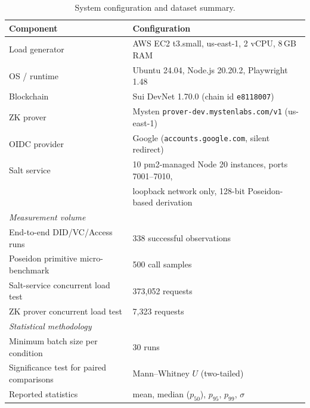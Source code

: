 \begin{table}[t]
  \centering
  \caption{System configuration and dataset summary.}
  \label{tab:system_config}
  \footnotesize
  \begin{tabular}{ll}
    \toprule
    \textbf{Component} & \textbf{Configuration} \\
    \midrule
    Load generator & AWS EC2 t3.small, us-east-1, 2 vCPU, 8\,GB RAM \\
    OS / runtime   & Ubuntu 24.04, Node.js 20.20.2, Playwright 1.48 \\
    Blockchain     & Sui DevNet 1.70.0 (chain id \texttt{e8118007}) \\
    ZK prover      & Mysten \texttt{prover-dev.mystenlabs.com/v1} (us-east-1) \\
    OIDC provider  & Google (\texttt{accounts.google.com}, silent redirect) \\
    Salt service   & 10 pm2-managed Node 20 instances, ports 7001--7010, \\
                   & loopback network only, 128-bit Poseidon-based derivation \\
    \midrule
    \multicolumn{2}{l}{\emph{Measurement volume}} \\
    End-to-end DID/VC/Access runs & 338 successful observations \\
    Poseidon primitive micro-benchmark & 500 call samples \\
    Salt-service concurrent load test  & 373,052 requests \\
    ZK prover concurrent load test     & 7,323 requests \\
    \midrule
    \multicolumn{2}{l}{\emph{Statistical methodology}} \\
    Minimum batch size per condition & 30 runs \\
    Significance test for paired comparisons & Mann--Whitney $U$ (two-tailed) \\
    Reported statistics & mean, median ($p_{50}$), $p_{95}$, $p_{99}$, $\sigma$ \\
    \bottomrule
  \end{tabular}
\end{table}
